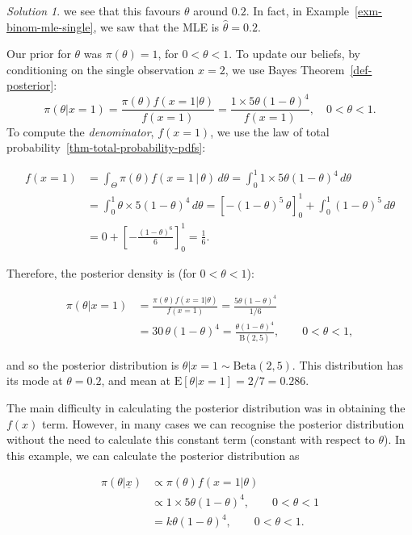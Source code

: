 \documentclass[
  letterpaper,
  DIV=11,
  numbers=noendperiod]{scrreprt}
\theoremstyle{definition}
\theoremstyle{plain}
\theoremstyle{definition}
\theoremstyle{remark}
\newtheorem{refsolution}{Solution}[chapter]
\begin{document}
\begin{refsolution}
we see that this favours \(\theta\) around \(0.2\). In fact, in
Example~\ref{exm-binom-mle-single}, we saw that the MLE is
\(\hat{\theta} = 0.2\).

Our prior for \(\theta\) was \(\pi(\theta) = 1\), for
\(0 < \theta < 1\). To update our beliefs, by conditioning on the single
observation \(x=2\), we use {Bayes Theorem~\ref{def-posterior}}: \[
    \pi(\theta|x=1)=\frac{\pi(\theta)f(x=1|\theta)}{f(x=1)} = \frac{1 \times 5\theta(1-\theta)^4}{f(x=1)}, \quad 0 < \theta < 1.
\] To compute the \emph{denominator}, \(f(x=1)\), we use the {law of
total probability~\ref{thm-total-probability-pdfs}}:

\begin{align*}
f(x=1) &=\int_\Theta\pi(\theta)f(x=1\, |\,\theta)\,d\theta = \int_0^1 1\times 5\theta(1-\theta)^4\,d\theta \\
&=\int_0^1 \theta\times 5(1-\theta)^4\,d\theta =\left[-(1-\theta)^5\,\theta\right]^1_0
+\int_0^1 (1-\theta)^5\,d\theta \\
&=0 + \left[-\frac{(1-\theta)^6}{6}\right]^1_0 =\frac{1}{6}. 
\end{align*}

Therefore, the posterior density is (for \(0<\theta<1\)):

\begin{align*}
\pi(\theta|x=1)&=\frac{\pi(\theta)f(x=1|\theta)}{f(x=1)} =\frac{5\theta(1-\theta)^4}{1/6}\\
&=30\,\theta(1-\theta)^4 =\frac{\theta(1-\theta)^4}{\mathrm{B}(2,5)},\quad\quad 0<\theta<1,
\end{align*}

and so the posterior distribution is
\(\theta|x=1\sim \textrm{Beta}(2,5)\). This distribution has its mode at
\(\theta=0.2\), and mean at \(\mathrm{E}[\theta|x=1]=2/7=0.286\).

\label{sol-biased-coin}

\end{refsolution}

The main difficulty in calculating the posterior distribution was in
obtaining the \(f(x)\) term. However, in many cases we can recognise the
posterior distribution without the need to calculate this constant term
(constant with respect to \(\theta\)). In this example, we can calculate
the posterior distribution as

\begin{align*}
\pi(\theta|\underline{x})&\propto\pi(\theta)f(x=1|\theta) \\
&\propto 1\times 5\theta(1-\theta)^4,\quad\quad 0<\theta<1  \\
&=k\theta(1-\theta)^4,\quad\quad 0<\theta<1.
\end{align*}
\end{document}
